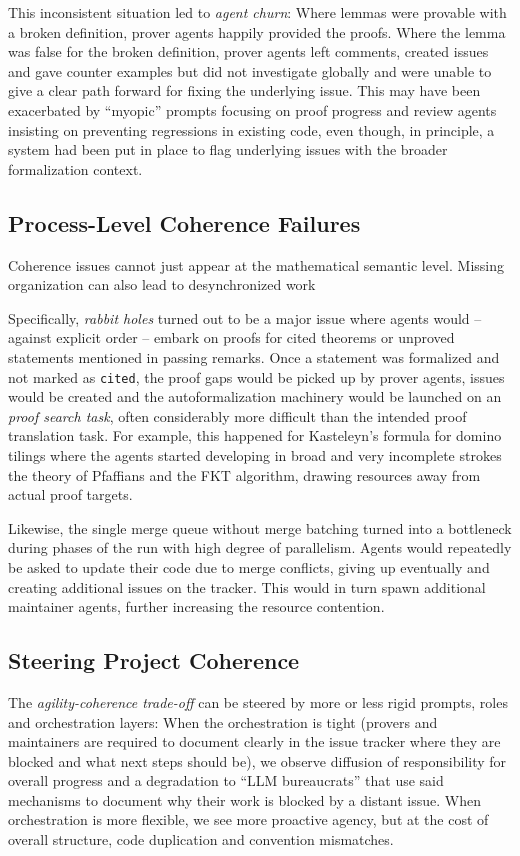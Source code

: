 \documentclass[]{fairmeta}
\begin{document}
\begin{itemize}
This inconsistent situation led to \emph{agent churn}: 
Where lemmas were provable with a broken definition, prover agents happily provided the proofs. Where the lemma was false for the broken definition, prover agents left comments, created issues and gave counter examples but did not investigate globally and were unable to give a clear path forward for fixing the underlying issue. This may have been exacerbated by ``myopic'' prompts focusing on proof progress and review agents insisting on preventing regressions in existing code, even though, in principle, a system had been put in place to flag underlying issues with the broader formalization context.
\end{itemize}

\subsection{Process-Level Coherence Failures}
Coherence issues cannot just appear at the mathematical semantic level. Missing organization can also lead to desynchronized work 

Specifically, \emph{rabbit holes} turned out to be a major issue where agents would -- against explicit order -- embark on proofs for cited theorems or unproved statements mentioned in passing remarks. Once a statement was formalized and not marked as \texttt{cited}, the proof gaps would be picked up by prover agents, issues would be created and the autoformalization machinery would be launched on an \emph{proof search task}, often considerably more difficult than the intended proof translation task. For example, this happened for Kasteleyn's formula for domino tilings where the agents started developing in broad and very incomplete strokes the theory of Pfaffians and the FKT algorithm, drawing resources away from actual proof targets.

Likewise, the single merge queue without merge batching turned into a bottleneck during phases of the run with high degree of parallelism. Agents would repeatedly be asked to update their code due to merge conflicts, giving up eventually and creating additional issues on the tracker. This would in turn spawn additional maintainer agents, further increasing the resource contention.

\subsection{Steering Project Coherence}
The \emph{agility-coherence trade-off} can be steered by more or less rigid prompts, roles and orchestration layers: When the orchestration is tight (provers and maintainers are required to document clearly in the issue tracker where they are blocked and what next steps should be), we observe diffusion of responsibility for overall progress and a degradation to ``LLM bureaucrats'' that use said mechanisms to document why their work is blocked by a distant issue. When orchestration is more flexible, we see more proactive agency, but at the cost of overall structure, code duplication and convention mismatches.
\end{document}
